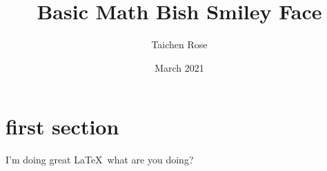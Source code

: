                                                                                                                                                                                                              \documentclass{article}
\title{Basic Math Bish Smiley Face}
\author{Taichen Rose}
\date{March 2021}
\begin{document}
\section{first section}

I'm doing great \LaTeX\ what are you doing?
\end{document}
